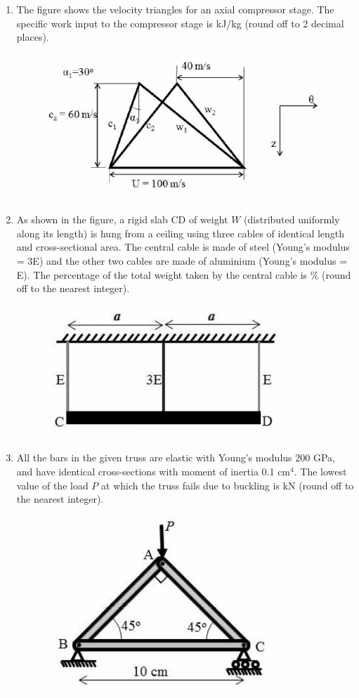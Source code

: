 \documentclass{article}
\begin{document}
\begin{enumerate}[leftmargin=*, resume]
\item The figure shows the velocity triangles for an axial compressor stage. The specific work input to the compressor stage is \underline{\hspace{1.5cm}} kJ/kg (round off to 2 decimal places).
\begin{figure}[H]
    \centering
    \includegraphics[width=0.4\linewidth]{figs/q55.png}
    \caption{}
    \label{fig:q55}
\end{figure}

\item As shown in the figure, a rigid slab CD of weight \( W \) (distributed uniformly along its length) is hung from a ceiling using three cables of identical length and cross-sectional area. The central cable is made of steel (Young’s modulus = 3E) and the other two cables are made of aluminium (Young’s modulus = E). The percentage of the total weight taken by the central cable is \underline{\hspace{1.5cm}} \% (round off to the nearest integer).
\begin{figure}[H]
    \centering
    \includegraphics[width=0.3\linewidth]{figs/q56.png}
    \caption{}
    \label{fig:q56}
\end{figure}

\item All the bars in the given truss are elastic with Young’s modulus 200 GPa, and have identical cross-sections with moment of inertia 0.1 cm\(^4\). The lowest value of the load \( P \) at which the truss fails due to buckling is \underline{\hspace{1.5cm}} kN (round off to the nearest integer).
\begin{figure}[H]
    \centering
    \includegraphics[width=0.3\linewidth]{figs/q57.png}
    \caption{}
    \label{fig:q57}
\end{figure}


\end{enumerate}
\end{document}

